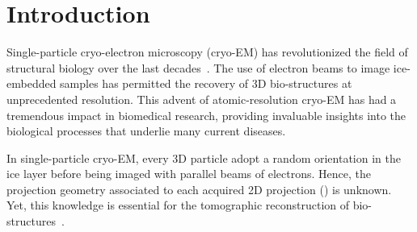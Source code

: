\section{Introduction}

Single-particle cryo-electron microscopy (cryo-EM) has revolutionized the field of structural biology over the last decades~\cite{dubochet1988cryo, frank2006three,chap0-nat2015MethodYear}. The use of electron beams to image ice-embedded samples has permitted the recovery of 3D bio-structures at unprecedented resolution. This advent of atomic-resolution cryo-EM has had a tremendous impact in biomedical research, providing invaluable insights into the biological processes that underlie many current diseases.

In single-particle cryo-EM, every 3D particle adopt a random orientation in the ice layer before being imaged with parallel beams of electrons.
Hence, the projection geometry associated to each acquired 2D projection () is unknown. Yet, this knowledge is essential for the tomographic reconstruction of bio-structures~\cite{Natterer2001mathematics}.

